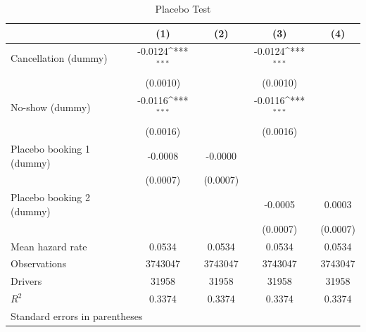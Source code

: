 \documentclass[reviewmode,AEJ]{AEA}
\begin{document}
\begin{table}
    \centering
    \footnotesize
    \caption{Placebo Test}
    \def\sym#1{\ifmmode^{#1}\else\(^{#1}\)\fi}
    \begin{tabularx}{\textwidth}{l@{\extracolsep{\fill}}*{4}{c}} 
        \toprule
        \toprule
                            &\multicolumn{1}{c}{(1)}         &\multicolumn{1}{c}{(2)}         &\multicolumn{1}{c}{(3)}         &\multicolumn{1}{c}{(4)}         \\
        \midrule
        Cancellation (dummy)&     -0.0124\sym{***}&                     &     -0.0124\sym{***}&                     \\
                            &    (0.0010)         &                     &    (0.0010)         &                     \\
        \addlinespace
        No-show (dummy)     &     -0.0116\sym{***}&                     &     -0.0116\sym{***}&                     \\
                            &    (0.0016)         &                     &    (0.0016)         &                     \\
        \addlinespace
        Placebo booking 1 (dummy)&     -0.0008         &     -0.0000         &                     &                     \\
                            &    (0.0007)         &    (0.0007)         &                     &                     \\
        \addlinespace
        Placebo booking 2 (dummy)&                     &                     &     -0.0005         &      0.0003         \\
                            &                     &                     &    (0.0007)         &    (0.0007)         \\
        \midrule
        Mean hazard rate    &      0.0534         &      0.0534         &       0.0534        &      0.0534         \\
        Observations        &     \num{3743047}   &     \num{3743047}   &     \num{3743047}   &     \num{3743047}   \\
        Drivers             &     \num{31958}     &      \num{31958}    &       \num{31958}   &       \num{31958}         \\
        \(R^2\)             &      0.3374         &      0.3374         &      0.3374         &      0.3374         \\
        \bottomrule
        \multicolumn{5}{l}{\footnotesize Standard errors in parentheses}\\

\end{tabularx}
\end{table}
\end{document}
